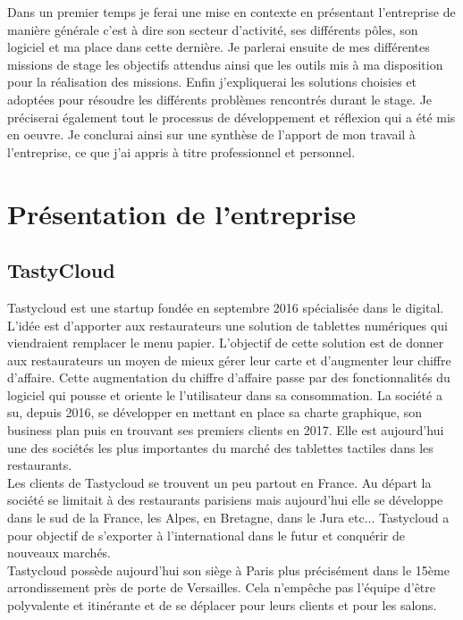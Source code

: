 Dans un premier temps je ferai une mise en contexte en présentant l'entreprise de manière générale c'est à dire son secteur d'activité, ses différents pôles, son logiciel et ma place dans cette dernière. Je parlerai ensuite de mes différentes missions de stage les objectifs attendus ainsi que les outils mis à ma disposition pour la réalisation des missions. Enfin j’expliquerai les solutions choisies et adoptées pour résoudre les différents problèmes rencontrés durant le stage. Je préciserai également tout le processus de développement et réflexion qui a été mis en oeuvre. Je conclurai ainsi sur une synthèse de l'apport de mon travail à l'entreprise, ce que j'ai appris à titre professionnel et personnel.

\clearpage


\section{Présentation de l'entreprise}
\subsection{TastyCloud}
Tastycloud est une startup fondée en septembre 2016 spécialisée dans le digital. L'idée est d'apporter aux restaurateurs une solution de tablettes numériques qui viendraient remplacer le menu papier. L'objectif de cette solution est de donner aux restaurateurs un moyen de mieux gérer leur carte et d'augmenter leur chiffre d'affaire. Cette augmentation du chiffre d'affaire passe par des fonctionnalités du logiciel qui pousse et oriente le l'utilisateur dans sa consommation. La société a su, depuis 2016, se développer en mettant en place sa charte graphique, son business plan puis en trouvant ses premiers clients en 2017. Elle est aujourd'hui une des sociétés les plus importantes du marché des tablettes tactiles dans les restaurants.\\

Les clients de Tastycloud se trouvent un peu partout en France. Au départ la société se limitait à des restaurants parisiens mais aujourd'hui elle se développe dans le sud de la France, les Alpes, en Bretagne, dans le Jura etc... Tastycloud a pour objectif de s'exporter à l'international dans le futur et conquérir de nouveaux marchés.\\

Tastycloud possède aujourd'hui son siège à Paris plus précisément dans le 15ème arrondissement près de porte de Versailles. Cela n'empêche pas l'équipe d'être polyvalente et itinérante et de se déplacer pour leurs clients et pour les salons.


